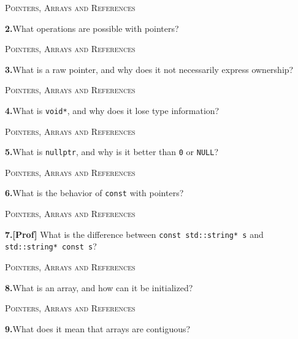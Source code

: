 \documentclass[11pt,a4paper]{article}
\newenvironment{questionblock}{%
  \begin{minipage}[t][0.455\textheight][t]{\textwidth}%
  \raggedright\small
}{%
  \vfill
  \end{minipage}%
}
\newcommand{\sectionlabel}[1]{\textsc{#1}\par\vspace{0.35em}}
\newcommand{\questionnumber}[1]{\textbf{#1.}\enspace}
\begin{document}
\newpage
\begin{questionblock}
\sectionlabel{Pointers, Arrays and References}
\questionnumber{2}What operations are possible with pointers?\par
\end{questionblock}
\vspace*{0.04\textheight}
\begin{questionblock}
\sectionlabel{Pointers, Arrays and References}
\questionnumber{3}What is a raw pointer, and why does it not necessarily express ownership?\par
\end{questionblock}
\newpage
\begin{questionblock}
\sectionlabel{Pointers, Arrays and References}
\questionnumber{4}What is \verb|void*|, and why does it lose type information?\par
\end{questionblock}
\vspace*{0.04\textheight}
\begin{questionblock}
\sectionlabel{Pointers, Arrays and References}
\questionnumber{5}What is \verb|nullptr|, and why is it better than \verb|0| or \verb|NULL|?\par
\end{questionblock}
\newpage
\begin{questionblock}
\sectionlabel{Pointers, Arrays and References}
\questionnumber{6}What is the behavior of \verb|const| with pointers?\par
\end{questionblock}
\vspace*{0.04\textheight}
\begin{questionblock}
\sectionlabel{Pointers, Arrays and References}
\questionnumber{7}\textbf{[Prof]} What is the difference between \verb|const std::string* s| and \verb|std::string* const s|?\par
\end{questionblock}
\newpage
\begin{questionblock}
\sectionlabel{Pointers, Arrays and References}
\questionnumber{8}What is an array, and how can it be initialized?\par
\end{questionblock}
\vspace*{0.04\textheight}
\begin{questionblock}
\sectionlabel{Pointers, Arrays and References}
\questionnumber{9}What does it mean that arrays are contiguous?\par
\end{questionblock}
\end{document}
